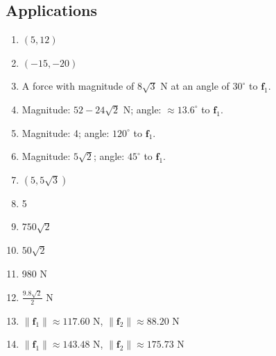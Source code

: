 \documentclass{article}
\begin{document}
\subsection{Applications}
\begin{enumerate}
  \item $(5, 12)$
  \item $(-15, -20)$
  \item A force with magnitude of $8\sqrt{3}$ N at an angle of $30^\circ$ to $\mathbf{f}_1$.
  \item Magnitude: $52-24\sqrt{2}$ N; angle: $\approx13.6^\circ$ to $\mathbf{f}_1$.
  \item Magnitude: 4; angle: $120^\circ$ to $\mathbf{f}_1$.
  \item Magnitude: $5\sqrt{2}$; angle: $45^\circ$ to $\mathbf{f}_1$.
  \item $(5, 5\sqrt{3})$
  \item 5
  \item $750\sqrt{2}$
  \item $50\sqrt{2}$
  \item 980 N
  \item $\frac{9.8\sqrt{2}}{2}$ N
  \item $\|\mathbf{f}_1\|\approx117.60$ N, $\|\mathbf{f}_2\|\approx88.20$ N
  \item $\|\mathbf{f}_1\|\approx143.48$ N, $\|\mathbf{f}_2\|\approx175.73$ N
\end{enumerate}
\end{document}
